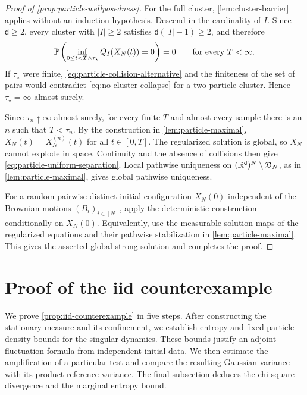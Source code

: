 \documentclass[11pt,reqno]{amsart}
\numberwithin{equation}{section}
\theoremstyle{plain}
\theoremstyle{remark}
\renewcommand{\d}{\mathsf{d}}\newcommand{\s}{\mathsf{s}}
\begin{document}
\begin{proof}[Proof of \cref{prop:particle-wellposedness}]
For the full cluster, \cref{lem:cluster-barrier} applies without an induction hypothesis. Descend in the cardinality of $I$. Since $\d\ge2$, every cluster with $|I|\ge2$ satisfies $\d(|I|-1)\ge2$, and therefore
\begin{equation}\label{eq:no-cluster-collapse}
 \mathbb P\left(\inf_{0\le t<T\wedge\tau_\star}Q_I(X_N(t))=0\right)=0
 \qquad\text{for every }T<\infty.
\end{equation}
If $\tau_\star$ were finite, \eqref{eq:particle-collision-alternative} and the finiteness of the set of pairs would contradict \eqref{eq:no-cluster-collapse} for a two-particle cluster. Hence $\tau_\star=\infty$ almost surely.

Since $\tau_n\uparrow\infty$ almost surely, for every finite $T$ and almost every sample there is an $n$ such that $T<\tau_n$. By the construction in \cref{lem:particle-maximal}, $X_N(t)=X_N^{(n)}(t)$ for all $t\in[0,T]$. The regularized solution is global, so $X_N$ cannot explode in space. Continuity and the absence of collisions then give \eqref{eq:particle-uniform-separation}. Local pathwise uniqueness on $(\R^\d)^N\setminus\mathfrak D_N$, as in \cref{lem:particle-maximal}, gives global pathwise uniqueness.

For a random pairwise-distinct initial configuration $X_N(0)$ independent of the Brownian motions $(B_i)_{i\in[N]}$, apply the deterministic construction conditionally on $X_N(0)$. Equivalently, use the measurable solution maps of the regularized equations and their pathwise stabilization in \cref{lem:particle-maximal}. This gives the asserted global strong solution and completes the proof.
\end{proof}

\par\endgroup

\begingroup
\section{Proof of the iid counterexample}\label{app:iid-counterexample}
We prove \cref{prop:iid-counterexample} in five steps. After constructing the stationary measure and its confinement, we establish entropy and fixed-particle density bounds for the singular dynamics. These bounds justify an adjoint fluctuation formula from independent initial data. We then estimate the amplification of a particular test and compare the resulting Gaussian variance with its product-reference variance. The final subsection deduces the chi-square divergence and the marginal entropy bound.
\end{document}
